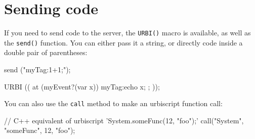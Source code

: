 \section{Sending \urbi code}

If you need to send \urbi code to the server, the \lstinline{URBI()}
macro is available, as well as the \lstinline{send()} function. You
can either pass it a string, or directly \urbi code inside a double
pair of parentheses:

\begin{urbiunchecked}
send ("myTag:1+1;");

URBI (( at (myEvent?(var x)) { myTag:echo x; }; ));
\end{urbiunchecked}

You can also use the \lstinline{call} method to make an urbiscript function
call:

\begin{urbiunchecked}
// C++ equivalent of urbiscript 'System.someFunc(12, "foo");'
call("System", "someFunc", 12, "foo");
\end{urbiunchecked}


